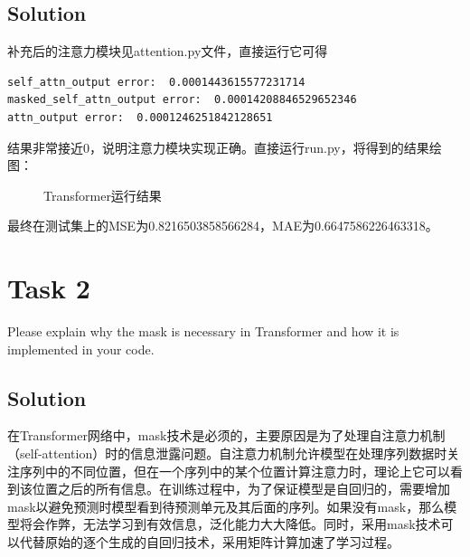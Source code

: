 \documentclass[
	12pt,
]{fphw}
\begin{document}
\subsection*{Solution}
补充后的注意力模块见attention.py文件，直接运行它可得
\begin{verbatim}
self_attn_output error:  0.0001443615577231714
masked_self_attn_output error:  0.00014208846529652346
attn_output error:  0.0001246251842128651
\end{verbatim}
\qquad 结果非常接近0，说明注意力模块实现正确。直接运行run.py，将得到的结果绘图：
\begin{figure}[h]
	\centering  %
	\caption{Transformer运行结果}
	\label{tr}
	\end{figure}
\qquad 最终在测试集上的MSE为0.8216503858566284，MAE为0.6647586226463318。



\section*{Task 2}

\begin{problem}
	\medskip
		\quad Please explain why the mask is necessary in Transformer and how it is implemented in your code.
	\end{problem}

\subsection*{Solution} 在Transformer网络中，mask技术是必须的，主要原因是为了处理自注意力机制（self-attention）时的信息泄露问题。自注意力机制允许模型在处理序列数据时关注序列中的不同位置，但在一个序列中的某个位置计算注意力时，理论上它可以看到该位置之后的所有信息。在训练过程中，为了保证模型是自回归的，需要增加mask以避免预测时模型看到待预测单元及其后面的序列。如果没有mask，那么模型将会作弊，无法学习到有效信息，泛化能力大大降低。同时，采用mask技术可以代替原始的逐个生成的自回归技术，采用矩阵计算加速了学习过程。
    
\end{document}
